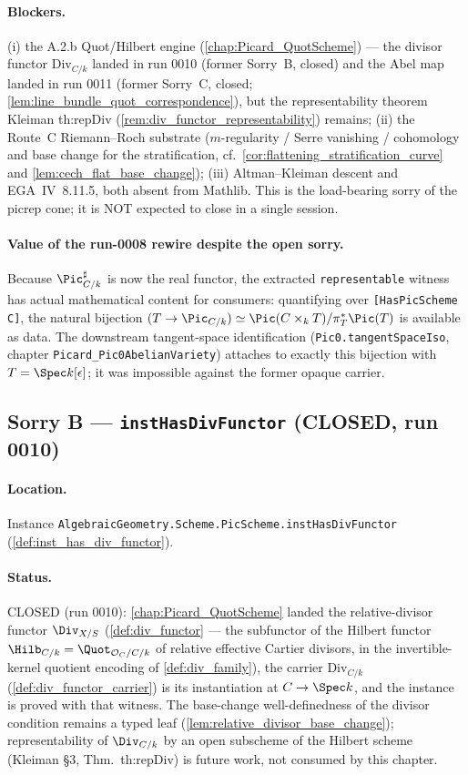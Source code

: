 \paragraph{Blockers.} (i) the A.2.b Quot/Hilbert engine
(\cref{chap:Picard_QuotScheme}) --- the divisor functor
\(\mathrm{Div}_{C/k}\) landed in run 0010 (former Sorry~B, closed) and
the Abel map landed in run 0011 (former Sorry~C, closed;
\cref{lem:line_bundle_quot_correspondence}), but the representability
theorem Kleiman th:repDiv (\cref{rem:div_functor_representability})
remains; (ii) the Route~C Riemann--Roch substrate
(\(m\)-regularity / Serre vanishing / cohomology and base change for the
stratification, cf.\ \cref{cor:flattening_stratification_curve} and
\cref{lem:cech_flat_base_change}); (iii) Altman--Kleiman descent and
EGA~IV~8.11.5, both absent from Mathlib. This is the load-bearing sorry
of the picrep cone; it is NOT expected to close in a single session.

\paragraph{Value of the run-0008 rewire despite the open sorry.} Because
\(\Pic^\sharp_{C/k}\) is now the real functor, the extracted
\texttt{representable} witness has actual mathematical content for
consumers: quantifying over \texttt{[HasPicScheme C]}, the natural
bijection \((T \to \Pic_{C/k}) \simeq \Pic(C \times_k T)/\pi_T^*\Pic(T)\)
is available as data. The downstream tangent-space identification
(\texttt{Pic0.tangentSpaceIso}, chapter
\texttt{Picard\_Pic0AbelianVariety}) attaches to exactly this bijection
with \(T = \Spec k[\epsilon]\); it was impossible against the former
opaque carrier.

\subsection{Sorry B --- \texttt{instHasDivFunctor} (CLOSED, run 0010)}
\label{subsec:sorry_has_div_functor}

\paragraph{Location.} Instance
\texttt{AlgebraicGeometry.Scheme.PicScheme.instHasDivFunctor}
(\cref{def:inst_has_div_functor}).

\paragraph{Status.} CLOSED (run 0010): \cref{chap:Picard_QuotScheme}
landed the relative-divisor functor \(\Div_{X/S}\)
(\cref{def:div_functor} --- the subfunctor of the Hilbert functor
\(\Hilb_{C/k} = \Quot_{\mathcal{O}_C/C/k}\) of relative effective Cartier
divisors, in the invertible-kernel quotient encoding of
\cref{def:div_family}), the carrier \(\mathrm{Div}_{C/k}\)
(\cref{def:div_functor_carrier}) is its instantiation at
\(C \to \Spec k\), and the instance is proved with that witness. The
base-change well-definedness of the divisor condition remains a typed leaf
(\cref{lem:relative_divisor_base_change}); representability of
\(\Div_{C/k}\) by an open subscheme of the Hilbert scheme (Kleiman \S 3,
Thm.~th:repDiv) is future work, not consumed by this chapter.

